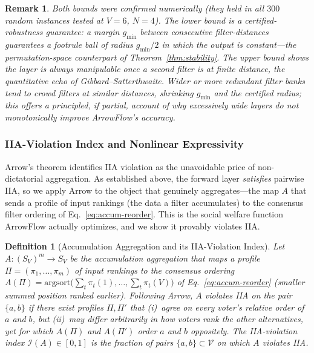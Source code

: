 \documentclass[12pt]{article}
\newcommand{\argsort}{\mathrm{argsort}}
\newtheorem{definition}[theorem]{Definition}
\newtheorem{remark}{Remark}
\begin{document}
\begin{remark}
Both bounds were confirmed numerically (they held in all $300$ random instances tested at $V = 6$, $N = 4$).  The lower bound is a certified-robustness guarantee: a margin $g_{\min}$ between consecutive filter-distances guarantees a footrule ball of radius $g_{\min}/2$ in which the output is constant---the permutation-space counterpart of Theorem~\ref{thm:stability}.  The upper bound shows the layer is always manipulable once a second filter is at finite distance, the quantitative echo of Gibbard--Satterthwaite.  Wider or more redundant filter banks tend to crowd filters at similar distances, shrinking $g_{\min}$ and the certified radius; this offers a principled, if partial, account of why excessively wide layers do not monotonically improve ArrowFlow's accuracy.
\end{remark}

\subsubsection{IIA-Violation Index and Nonlinear Expressivity}

Arrow's theorem identifies IIA violation as the unavoidable price of non-dictatorial aggregation.  As established above, the forward layer \emph{satisfies} pairwise IIA, so we apply Arrow to the object that genuinely aggregates---the map $A$ that sends a profile of input rankings (the data a filter accumulates) to the consensus filter ordering of Eq.~\eqref{eq:accum-reorder}.  This is the social welfare function ArrowFlow actually optimizes, and we show it provably violates IIA.

\begin{definition}[Accumulation Aggregation and its IIA-Violation Index]
\label{def:iia-index}
Let $A\colon (S_V)^m \to S_V$ be the accumulation aggregation that maps a profile $\Pi = (\pi_1, \dots, \pi_m)$ of input rankings to the consensus ordering $A(\Pi) = \argsort\!\bigl(\sum_t \pi_t(1), \dots, \sum_t \pi_t(V)\bigr)$ of Eq.~\eqref{eq:accum-reorder} (smaller summed position ranked earlier).  Following Arrow, $A$ \emph{violates IIA on the pair $\{a,b\}$} if there exist profiles $\Pi, \Pi'$ that
(i)~agree on every voter's relative order of $a$ and $b$, but
(ii)~may differ arbitrarily in how voters rank the \emph{other} alternatives,
yet for which $A(\Pi)$ and $A(\Pi')$ order $a$ and $b$ oppositely.  The \emph{IIA-violation index} $\mathcal{I}(A) \in [0,1]$ is the fraction of pairs $\{a,b\}\subset\mathcal{V}$ on which $A$ violates IIA.
\end{definition}
\end{document}
